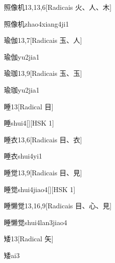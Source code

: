 \begin{entry}{照像机}{13,13,6}[Radicais ⽕、⼈、⽊]
  \begin{phonetics}{照像机}{zhao4xiang4ji1}
  \end{phonetics}
\end{entry}

\begin{entry}{瑜伽}{13,7}[Radicais ⽟、⼈]
  \begin{phonetics}{瑜伽}{yu2jia1}
  \end{phonetics}
\end{entry}

\begin{entry}{瑜珈}{13,9}[Radicais ⽟、⽟]
  \begin{phonetics}{瑜珈}{yu2jia1}
  \end{phonetics}
\end{entry}

\begin{entry}{睡}{13}[Radical ⽬]
  \begin{phonetics}{睡}{shui4}[][HSK 1]
  \end{phonetics}
\end{entry}

\begin{entry}{睡衣}{13,6}[Radicais ⽬、⾐]
  \begin{phonetics}{睡衣}{shui4yi1}
  \end{phonetics}
\end{entry}

\begin{entry}{睡觉}{13,9}[Radicais ⽬、⾒]
  \begin{phonetics}{睡觉}{shui4jiao4}[][HSK 1]
  \end{phonetics}
\end{entry}

\begin{entry}{睡懒觉}{13,16,9}[Radicais ⽬、⼼、⾒]
  \begin{phonetics}{睡懒觉}{shui4lan3jiao4}
  \end{phonetics}
\end{entry}

\begin{entry}{矮}{13}[Radical ⽮]
  \begin{phonetics}{矮}{ai3}
  \end{phonetics}
\end{entry}

